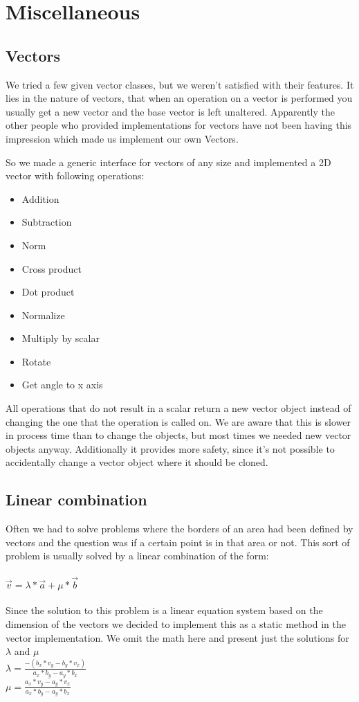 
\section{Miscellaneous}

\subsection{Vectors}
\label{sec:vectors}

We tried a few given vector classes, but we weren't satisfied
with their features. It lies in the nature of vectors, that when an 
operation on a vector is performed you usually get a new vector and 
the base vector is left unaltered. Apparently the other people who 
provided implementations for vectors have not been having this impression 
which made us implement our own Vectors.

\noindent So we made a generic interface for vectors of any size and
implemented a 2D vector with following operations:

\begin{itemize}
\item Addition
\item Subtraction
\item Norm
\item Cross product
\item Dot product
\item Normalize
\item Multiply by scalar
\item Rotate 
\item Get angle to x axis
\end{itemize}

All operations that do not result in a scalar return a new vector object
instead of changing the one that the operation is called on. We are aware
that this is slower in process time than to change the objects, but most
times we needed new vector objects anyway. Additionally it provides more
safety, since it's not possible to accidentally change a vector object
where it should be cloned.
\subsection{Linear combination}
\label{sec:linearCombination}

Often we had to solve problems where the borders of an area had been defined 
by vectors and the question was if a certain point is in that area or not.
This sort of problem is usually solved by a linear combination of the form:\\
\\
$ \vec{v} = \lambda * \vec{a} + \mu * \vec{b} $\\
\\
Since the solution to this problem is a linear equation system based on the 
dimension of the vectors we decided to implement this as a static method in 
the vector implementation. We omit the math here and present just the solutions 
for $\lambda$ and $\mu$\\

$ \lambda = \frac{-(b_x*v_y - b_y * v_x)}{a_x * b_y - a_y * b_x}$\\

$\mu = \frac{a_x * v_y - a_y * v_x}{a_x * b_y - a_y * b_x} $ \\

